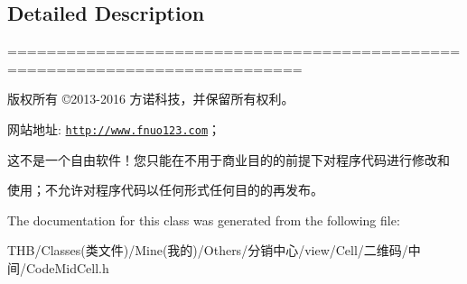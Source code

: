 \subsection{Detailed Description}
============================================================================

版权所有 ©2013-\/2016 方诺科技，并保留所有权利。

网站地址\+: \href{http://www.fnuo123.com}{\tt http\+://www.\+fnuo123.\+com}； 



这不是一个自由软件！您只能在不用于商业目的的前提下对程序代码进行修改和

使用；不允许对程序代码以任何形式任何目的的再发布。 

 

The documentation for this class was generated from the following file\+:\begin{DoxyCompactItemize}
\item 
T\+H\+B/\+Classes(类文件)/\+Mine(我的)/\+Others/分销中心/view/\+Cell/二维码/中间/Code\+Mid\+Cell.\+h\end{DoxyCompactItemize}
